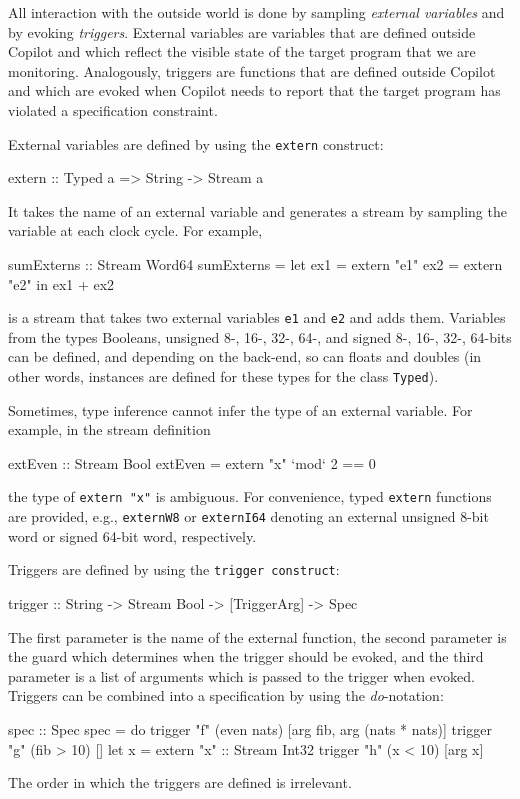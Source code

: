 \documentclass[]{article}
\theoremstyle{example}
\begin{document}
All interaction with the outside world is done by sampling \emph{external
  variables} and by evoking \emph{triggers}.  External variables are variables
that are defined outside Copilot and which reflect the visible state of the
target program that we are monitoring.  Analogously, triggers are functions that
are defined outside Copilot and which are evoked when Copilot needs to report
that the target program has violated a specification constraint.

External variables are defined by using the {\tt extern} construct:
%
\begin{code}
extern :: Typed a => String -> Stream a
\end{code}
%
\noindent
It takes the name of an external variable and generates a stream by sampling
the variable at each clock cycle.  For example, 
%
\begin{code}
sumExterns :: Stream Word64
sumExterns =
  let ex1 = extern "e1"
      ex2 = extern "e2"
  in  ex1 + ex2
\end{code}
%
is a stream that takes two external variables {\tt e1} and {\tt e2} and adds
them.  Variables from the types Booleans, unsigned 8-, 16-, 32-, 64-, and signed 8-, 16-, 32-,
64-bits can be defined, and depending on the back-end, so can floats and
doubles (in other words, instances are defined for these types for the class
{\tt Typed}).

Sometimes, type inference cannot infer the type of an external variable.  For
example, in the stream definition
%
\begin{code}
extEven :: Stream Bool
extEven = extern "x" `mod` 2 == 0
\end{code}
%
the type of {\tt extern "x"} is ambiguous.  For convenience, typed {\tt extern}
functions are provided, e.g., {\tt externW8} or {\tt externI64} denoting an
external unsigned 8-bit word or signed 64-bit word, respectively.

Triggers are defined by using the {\tt trigger construct}:
%
\begin{code}
trigger :: String -> Stream Bool -> [TriggerArg] -> Spec
\end{code}
%
The first parameter is the name of the external function, the second parameter is the
guard which determines when the trigger should be evoked, and the third parameter
is a list of arguments which is passed to the trigger when evoked.
Triggers can be combined into a specification by using the \emph{do}-notation:
%
\begin{code}
spec :: Spec
spec = do
  trigger "f" (even nats) [arg fib, arg (nats * nats)]
  trigger "g" (fib > 10) []
  let x = extern "x" :: Stream Int32
  trigger "h" (x < 10) [arg x]
\end{code}
%
The order in which the triggers are defined is irrelevant.
\end{document}
